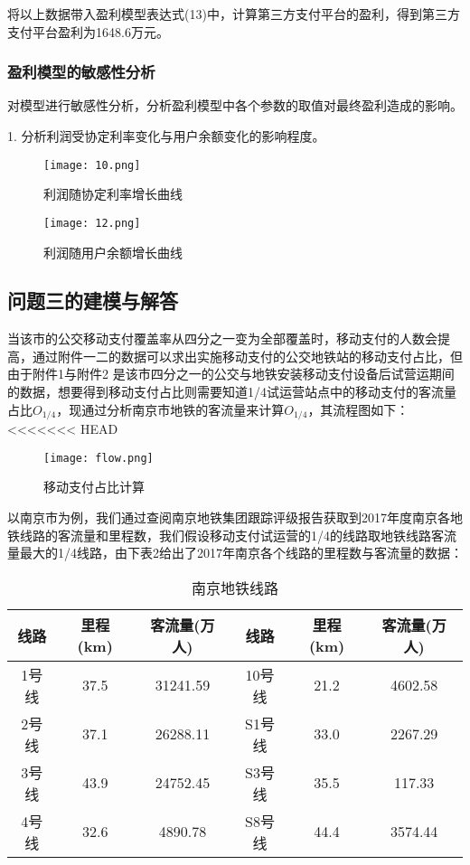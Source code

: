\documentclass[withoutpreface,bwprint]{cumcmthesis} %
\begin{document}
将以上数据带入盈利模型表达式(13)中，计算第三方支付平台的盈利，得到第三方支付平台盈利为1648.6万元。
\subsubsection{盈利模型的敏感性分析}
对模型进行敏感性分析，分析盈利模型中各个参数的取值对最终盈利造成的影响。

1. 分析利润受协定利率变化与用户余额变化的影响程度。
\begin{figure}[h]
\centering
\begin{minipage}[c]{0.4\textwidth}
\centering
\texttt{[image: 10.png]}
\caption{利润随协定利率增长曲线}
\end{minipage}
\begin{minipage}[c]{0.4\textwidth}
\centering
\texttt{[image: 12.png]}
\caption{利润随用户余额增长曲线}
\end{minipage}
\end{figure}
\subsection{问题三的建模与解答}
当该市的公交移动支付覆盖率从四分之一变为全部覆盖时，移动支付的人数会提高，通过附件一二的数据可以求出实施移动支付的公交地铁站的移动支付占比，但由于附件1与附件2 是该市四分之一的公交与地铁安装移动支付设备后试营运期间的数据，想要得到移动支付占比则需要知道1/4试运营站点中的移动支付的客流量占比$O_{1/4}$，现通过分析南京市地铁的客流量来计算$O_{1/4}$，其流程图如下：
<<<<<<< HEAD

\begin{figure}[h]
\centering
\texttt{[image: flow.png]}
\caption{移动支付占比计算}
\end{figure}
以南京市为例，我们通过查阅南京地铁集团跟踪评级报告获取到2017年度南京各地铁线路的客流量和里程数，我们假设移动支付试运营的1/4的线路取地铁线路客流量最大的1/4线路，由下表2给出了2017年南京各个线路的里程数与客流量的数据：
\begin{center}
\makeatletter{}\makeatother
\begin{table}[h]
\centering
\caption{南京地铁线路}\label{tab:aStrangeTable}\centering%
\begin{tabular}{c|c|c|c|c|c}\hline
线路&里程(km)&客流量(万人)&线路&里程(km)&客流量(万人)\\\hline
1号线&37.5&31241.59&10号线&21.2&4602.58\\
2号线&37.1&26288.11&S1号线&33.0&2267.29\\
3号线&43.9&24752.45&S3号线&35.5&117.33\\
4号线&32.6&4890.78&S8号线&44.4&3574.44\\\hline
\end{tabular}
\end{table}
\end{center}
\end{document}
